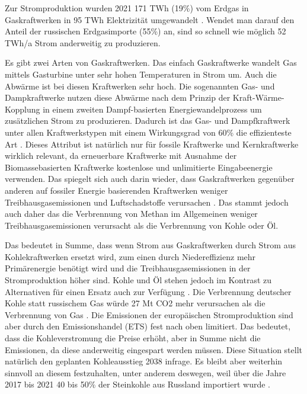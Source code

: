 Zur Stromproduktion wurden 2021 171 TWh (19\%) vom Erdgas in Gaskraftwerken in 95 TWh Elektrizität umgewandelt \cite{clausen2022}. Wendet man darauf den Anteil der russischen Erdgasimporte (55\%) an, sind so schnell wie möglich 52 TWh/a Strom anderweitig zu produzieren.

Es gibt zwei Arten von Gaskraftwerken. Das einfach Gaskraftwerke wandelt Gas mittels Gasturbine unter sehr hohen Temperaturen in Strom um. Auch die Abwärme ist bei diesen Kraftwerken sehr hoch. Die sogenannten Gas- und Dampkraftwerke nutzen diese Abwärme nach dem Prinzip der Kraft-Wärme-Kopplung in einem zweiten Dampf-basierten Energiewandelprozess um zusätzlichen Strom zu produzieren. Dadurch ist das Gas- und Dampfkraftwerk unter allen Kraftwerkstypen mit einem Wirkungsgrad von 60\% die effizienteste Art \cite{ei1}. Dieses Attribut ist natürlich nur für fossile Kraftwerke und Kernkraftwerke wirklich relevant, da erneuerbare Kraftwerke mit Ausnahme der Biomassebasierten Kraftwerke kostenlose und unlimitierte Eingabeenergie verwenden.
Das spiegelt sich auch darin wieder, dass Gaskraftwerken gegenüber anderen auf fossiler Energie basierenden Kraftwerken weniger Treibhausgasemissionen und Luftschadstoffe verursachen \cite{uba-co2}. Das stammt jedoch auch daher das die Verbrennung von Methan im Allgemeinen weniger Treibhausgasemissionen verursacht als die Verbrennung von Kohle oder Öl.

Das bedeutet in Summe, dass wenn Strom aus Gaskraftwerken durch Strom aus Kohlekraftwerken ersetzt wird, zum einen durch Niedereffizienz mehr Primärenergie benötigt wird und die Treibhausgasemissionen in der Stromproduktion höher sind. Kohle und Öl stehen jedoch im Kontrast zu Alternativen für einen Ersatz auch zur Verfügung \cite{iea2022}. Die Verbrennung deutscher Kohle statt russischem Gas würde 27 Mt CO2 mehr verursachen als die Verbrennung von Gas \cite{leo}. 
Die Emissionen der europäischen Stromproduktion sind aber durch den Emissionshandel (ETS) fest nach oben limitiert. Das bedeutet, dass die Kohleverstromung die Preise erhöht, aber in Summe nicht die Emissionen, da diese anderweitig eingespart werden müssen. Diese Situation stellt natürlich den geplanten Kohleausstieg 2038 infrage. Es bleibt aber weiterhin sinnvoll an diesem festzuhalten, unter anderem deswegen, weil über die Jahre 2017 bis 2021 40 bis 50\% der Steinkohle aus Russland importiert wurde \cite{steinkohle-import}.

